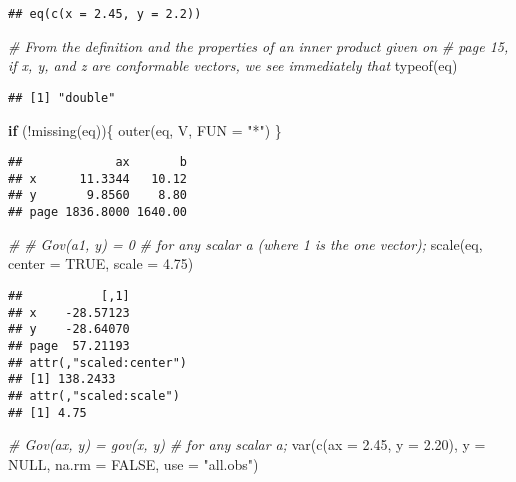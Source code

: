 \documentclass[
]{article}
\newenvironment{Shaded}{\begin{snugshade}}{\end{snugshade}}
\newcommand{\AttributeTok}[1]{\textcolor[rgb]{0.77,0.63,0.00}{#1}}
\newcommand{\CommentTok}[1]{\textcolor[rgb]{0.56,0.35,0.01}{\textit{#1}}}
\newcommand{\ConstantTok}[1]{\textcolor[rgb]{0.00,0.00,0.00}{#1}}
\newcommand{\ControlFlowTok}[1]{\textcolor[rgb]{0.13,0.29,0.53}{\textbf{#1}}}
\newcommand{\FloatTok}[1]{\textcolor[rgb]{0.00,0.00,0.81}{#1}}
\newcommand{\FunctionTok}[1]{\textcolor[rgb]{0.00,0.00,0.00}{#1}}
\newcommand{\NormalTok}[1]{#1}
\newcommand{\SpecialCharTok}[1]{\textcolor[rgb]{0.00,0.00,0.00}{#1}}
\newcommand{\StringTok}[1]{\textcolor[rgb]{0.31,0.60,0.02}{#1}}
\begin{document}
\begin{verbatim}
## eq(c(x = 2.45, y = 2.2))
\end{verbatim}

\begin{Shaded}
\begin{Highlighting}[]
\CommentTok{\# From the definition and the properties of an inner product given on}
\CommentTok{\# page 15, if x, y, and z are conformable vectors, we see immediately that}
\FunctionTok{typeof}\NormalTok{(eq)}
\end{Highlighting}
\end{Shaded}

\begin{verbatim}
## [1] "double"
\end{verbatim}

\begin{Shaded}
\begin{Highlighting}[]
\ControlFlowTok{if}\NormalTok{ (}\SpecialCharTok{!}\FunctionTok{missing}\NormalTok{(eq))\{}
   \FunctionTok{outer}\NormalTok{(eq, V, }\AttributeTok{FUN =} \StringTok{"*"}\NormalTok{)}
\NormalTok{ \}}
\end{Highlighting}
\end{Shaded}

\begin{verbatim}
##             ax       b
## x      11.3344   10.12
## y       9.8560    8.80
## page 1836.8000 1640.00
\end{verbatim}

\begin{Shaded}
\begin{Highlighting}[]
\CommentTok{\# }
\CommentTok{\# Gov(a1, y) = 0}
\CommentTok{\# for any scalar a (where 1 is the one vector);}
\FunctionTok{scale}\NormalTok{(eq, }\AttributeTok{center =} \ConstantTok{TRUE}\NormalTok{, }\AttributeTok{scale =} \FloatTok{4.75}\NormalTok{)}
\end{Highlighting}
\end{Shaded}

\begin{verbatim}
##           [,1]
## x    -28.57123
## y    -28.64070
## page  57.21193
## attr(,"scaled:center")
## [1] 138.2433
## attr(,"scaled:scale")
## [1] 4.75
\end{verbatim}

\begin{Shaded}
\begin{Highlighting}[]
\CommentTok{\# Gov(ax, y) = gov(x, y)}
\CommentTok{\# for any scalar a;}
\FunctionTok{var}\NormalTok{(}\FunctionTok{c}\NormalTok{(}\AttributeTok{ax =} \FloatTok{2.45}\NormalTok{, }\AttributeTok{y =} \FloatTok{2.20}\NormalTok{), }\AttributeTok{y =} \ConstantTok{NULL}\NormalTok{, }\AttributeTok{na.rm =} \ConstantTok{FALSE}\NormalTok{, }\AttributeTok{use =} \StringTok{"all.obs"}\NormalTok{)}
\end{Highlighting}
\end{Shaded}
\end{document}
